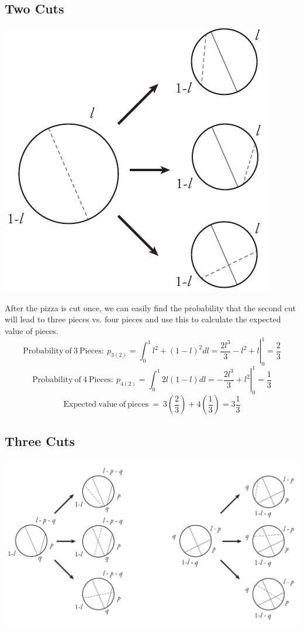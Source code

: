 \documentclass{article}
\begin{document}
\subsection*{Two Cuts}

\centerline{\includegraphics[scale = 0.75]{Slice-2Cut.pdf}}

After the pizza is cut once, we can easily find the probability that the second cut will lead to three pieces vs. four pieces and use this to calculate the expected value of pieces.
$$ \mathrm{Probability~of~3~Pieces:~} p_{3(2)} = \int_0^1 l^2 + (1 - l)^2 dl = \left. \frac{2l^3}{3} - l^2 + l \right\vert_0^1 = \frac{2}{3}$$
$$ \mathrm{Probability~of~4~Pieces:~} p_{4(2)} = \int_0^1 2l(1 - l) dl = \left. -\frac{2l^3}{3} + l^2 \right\vert_0^1 = \frac{1}{3}$$
$$ \mathrm{Expected~value~of~pieces~=~} 3\left(\frac{2}{3}\right) + 4\left(\frac{1}{3}\right) = 3\frac{1}{3}$$

\subsection*{Three Cuts}

\centerline{\includegraphics[scale = 0.75]{Slice-3Cut.pdf}}
\end{document}
